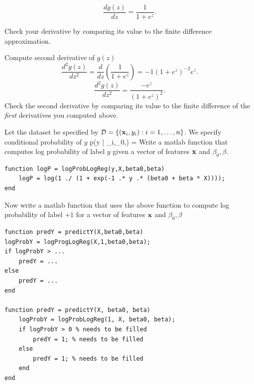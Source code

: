 \documentclass{article}
\begin{document}
\[
\frac{dg(z)}{dz} = \frac{1}{1+e^{z}}.
\]

Check your derivative by comparing its value to the finite difference approximation.

\newproblem{1pt}
Compute second derivative of $g(z)$
\[
\frac{d^{2}g(z)}{dz^{2}} = \frac{d}{dz}(\frac{1}{1+e^{z}}) = -1 (1+e^{z})^{-2} e^{z}.
\]
\[
\frac{d^{2}g(z)}{dz^{2}} = \frac{-e^{z}}{(1+e^{z})^{2}}.
\]
Check the second derivative by comparing its value to the finite difference of the {\em first} derivatives you computed above.


\newproblem{1pt}
Let the dataset be specified by $\mathcal{D} = \left\{ (\mathbf{x}_i,y_i):i=1,\dots,n \right\}$. We specify conditional probability of $y$
\BEQ \label{eq:plr}
p(y | \xx_i,\beta_0,\beta) = 
\EEQ
Write a matlab function that computes log probability of label $y$ given a vector of features $\mathbf{x}$ and $\beta_0,\beta$.
\begin{verbatim}
function logP = logProbLogReg(y,X,beta0,beta)
    logP = log(1 ./ (1 + exp(-1 .* y .* (beta0 + beta * X))));
end
\end{verbatim}

Now write a matlab function that uses the above function to compute log probability of label $+1$ for a vector of features $\mathbf{x}$ and $\beta_0,\beta$
\begin{verbatim}
function predY = predictY(X,beta0,beta)
logProbY = logProgLogReg(X,1,beta0,beta);
if logProbY > ...
    predY = ...
else
    predY = ...
end

function predY = predictY(X, beta0, beta)
    logProbY = logProbLogReg(1, X, beta0, beta);
    if logProbY > 0 % needs to be filled
        predY = 1; % needs to be filled
    else
        predY = 1; % needs to be filled
    end
end
\end{verbatim}
\end{document}
